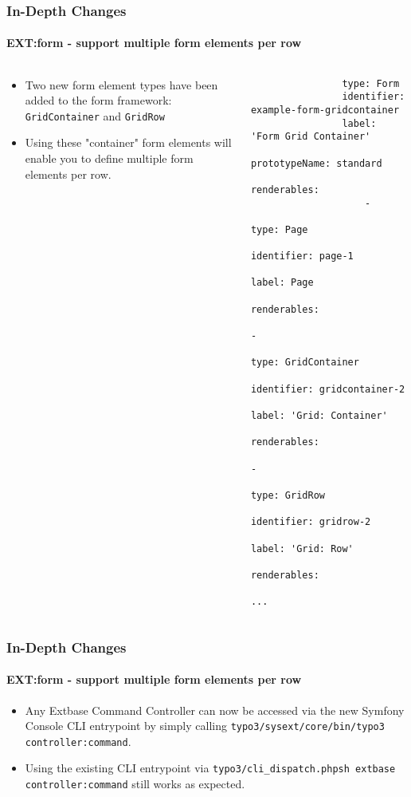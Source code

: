 \begin{frame}[fragile]
	\frametitle{In-Depth Changes}
	\framesubtitle{EXT:form - support multiple form elements per row}

	\lstset{basicstyle=\tiny\ttfamily}

	\begin{columns}[T]
		\begin{column}{0.5\textwidth}
			\begin{itemize}
				\item Two new form element types have been added to the form framework: \texttt{GridContainer}
					and \texttt{GridRow}

				\item Using these "container" form elements will enable you to define multiple form elements per row.
			\end{itemize}
		\end{column}
		\begin{column}{0.5\textwidth}
			\begin{lstlisting}
				type: Form
				identifier: example-form-gridcontainer
				label: 'Form Grid Container'
				prototypeName: standard
				renderables:
				    -
				        type: Page
				        identifier: page-1
				        label: Page
				        renderables:
				            -
				                type: GridContainer
				                identifier: gridcontainer-2
				                label: 'Grid: Container'
				                renderables:
				                    -
				                        type: GridRow
				                        identifier: gridrow-2
				                        label: 'Grid: Row'
				                        renderables:
				                        ...
			\end{lstlisting}
		\end{column}
	\end{columns}

\end{frame}


\begin{frame}[fragile]
	\frametitle{In-Depth Changes}
	\framesubtitle{EXT:form - support multiple form elements per row}

	\begin{itemize}
		\item Any Extbase Command Controller can now be accessed via the new Symfony Console
			CLI entrypoint by simply calling
			\texttt{typo3/sysext/core/bin/typo3 controller:command}.

		\item Using the existing CLI entrypoint via
			\texttt{typo3/cli\_dispatch.phpsh extbase controller:command} still works as expected.
	\end{itemize}

\end{frame}


